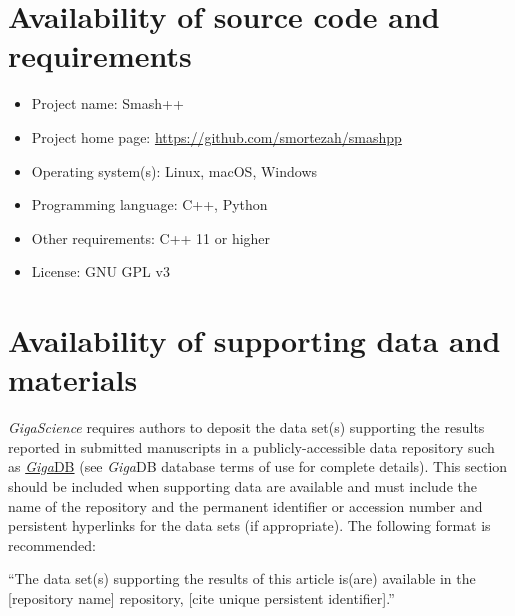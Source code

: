 \documentclass[a4paper,num-refs]{oup-contemporary}
\begin{document}


\section{Availability of source code and requirements}
\begin{itemize}
\item Project name: Smash++
\item Project home page: \url{https://github.com/smortezah/smashpp}
\item Operating system(s): Linux, macOS, Windows
\item Programming language: C++, Python
\item Other requirements: C++ 11 or higher
\item License: GNU GPL v3
\end{itemize}

\section{Availability of supporting data and materials}

\textit{GigaScience} requires authors to deposit the data set(s) supporting the results reported in submitted manuscripts in a publicly-accessible data repository such as \href{http://gigadb.org/}{\textit{Giga}DB} (see \textit{Giga}DB database terms of use for complete details). This section should be included when supporting data are available and must include the name of the repository and the permanent identifier or accession number and persistent hyperlinks for the data sets (if appropriate). The following format is recommended:

``The data set(s) supporting the results of this article is(are) available in the [repository name] repository, [cite unique persistent identifier].''
\end{document}
